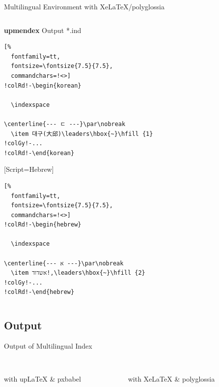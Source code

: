 \documentclass[aspectratio=169,10pt]{beamer}
\begin{document}
\begin{frame}[fragile]{Multilingual Environment with XeLaTeX/polyglossia}
\begin{columns}
\begin{column}{64mm}
\begin{exampleblock}{\textbf{upmendex} Output *.ind}
\begin{Verbatim}[%
  fontfamily=tt,
  fontsize=\fontsize{7.5}{7.5},
  commandchars=!<>]
!colRd!-\begin{korean}

  \indexspace

\centerline{--- ㄷ ---}\par\nobreak
  \item 대구(大邱)\leaders\hbox{~}\hfill {1}
!colGy!-...
!colRd!-\end{korean}
\end{Verbatim}
\setsansfont{SILEOT.ttf}
\setmonofont{DejaVu Sans}[Script=Hebrew]
\begin{hebrew}
\begin{Verbatim}[%
  fontfamily=tt,
  fontsize=\fontsize{7.5}{7.5},
  commandchars=!<>]
!colRd!-\begin{hebrew}

  \indexspace

\centerline{--- א ---}\par\nobreak
  \item אשדוד!,\leaders\hbox{~}\hfill {2}
!colGy!-...
!colRd!-\end{hebrew}
\end{Verbatim}
\end{hebrew}
\end{exampleblock}
\end{column}
\end{columns}

\end{frame}


\subsection{Output}
\begin{frame}[fragile]{Output of Multilingual Index}
\begin{columns}

\begin{column}{60mm}
\begin{center}
\\[1mm]%
\footnotesize with upLaTeX \& pxbabel
\end{center}
\end{column}

\begin{column}{60mm}
\begin{center}
\\[1mm]%
\footnotesize with XeLaTeX \& polyglossia
\end{center}
\end{column}
\end{columns}

\end{frame}
\end{document}
